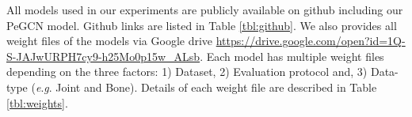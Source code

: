 \documentclass[runningheads]{llncs}
\newcommand{\eg}{\textit{e}.\textit{g}. }
\begin{document}
All models used in our experiments are publicly available on github including our PeGCN model.
Github links are listed in Table \ref{tbl:github}. We also provides all weight files of the models via Google drive \url{https://drive.google.com/open?id=1Q-S-JAJwURPH7cy9-h25Mo0p15w_ALsb}.
Each model has multiple weight files depending on the three factors: 1) Dataset, 2) Evaluation protocol and, 3) Data-type (\eg Joint and Bone).
Details of each weight file are described in Table \ref{tbl:weights}.


\begin{table}[h]
    \caption{Publicly available source codes.}
\centering
{}
\vspace{0.5ex}
\label{tbl:github}
\end{table}
\end{document}
